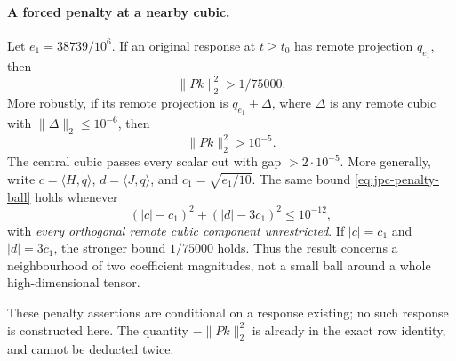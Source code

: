 \paragraph{A forced penalty at a nearby cubic.}
Let $e_1=38739/10^6$. If an original response at $t\ge t_0$ has remote
projection $q_{e_1}$, then
\begin{equation}\label{eq:jpc-penalty-center}
 \|Pk\|_2^2>1/75000.
\end{equation}
More robustly, if its remote projection is $q_{e_1}+\Delta$, where
$\Delta$ is any remote cubic with $\|\Delta\|_2\le10^{-6}$, then
\begin{equation}\label{eq:jpc-penalty-ball}
 \boxed{\quad \|Pk\|_2^2>10^{-5}.\quad}
\end{equation}
The central cubic passes every scalar cut with gap $>2\cdot10^{-5}$.
More generally, write $c=\langle H,q\rangle$,
$d=\langle J,q\rangle$, and $c_1=\sqrt{e_1/10}$. The same bound
\eqref{eq:jpc-penalty-ball} holds whenever
\begin{equation}\label{eq:jpc-penalty-projections}
 (|c|-c_1)^2+(|d|-3c_1)^2\le10^{-12},
\end{equation}
with \emph{every orthogonal remote cubic component unrestricted}.
If $|c|=c_1$ and $|d|=3c_1$, the stronger bound $1/75000$ holds.
Thus the result concerns a neighbourhood of two coefficient magnitudes,
not a small ball around a whole high-dimensional tensor.

These penalty assertions are conditional on a response existing;
no such response is constructed here. The quantity $-\|Pk\|_2^2$
is already in the exact row identity, and cannot be deducted twice.

